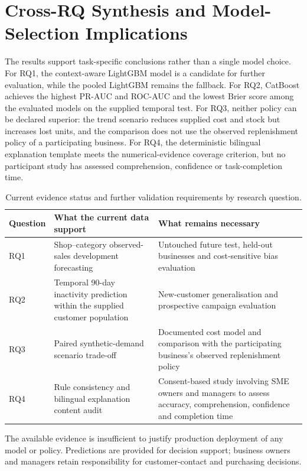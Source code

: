 

\section{Cross-RQ Synthesis and Model-Selection Implications}

The results support task-specific conclusions rather than a single model
choice. For RQ1, the context-aware LightGBM model is a candidate for further
evaluation, while the pooled LightGBM remains the fallback. For RQ2,
CatBoost achieves the highest PR-AUC and ROC-AUC and the lowest Brier score
among the evaluated models on the supplied temporal test. For RQ3, neither
policy can be declared superior: the trend scenario reduces supplied cost
and stock but increases lost units, and the comparison does not use the
observed replenishment policy of a participating business. For RQ4, the
deterministic bilingual explanation template meets the numerical-evidence
coverage criterion, but no participant study has assessed comprehension,
confidence or task-completion time.

\begin{table}[H]
\centering
\small
\caption{Current evidence status and further validation requirements by research question.}
\label{tab:rq_evidence_status}
\begin{tabularx}{\textwidth}{|p{}|X|X|}
\hline
\textbf{Question} & \textbf{What the current data support} & \textbf{What remains necessary} \\
\hline
RQ1 & Shop--category observed-sales development forecasting & Untouched future test, held-out businesses and cost-sensitive bias evaluation \\
\hline
RQ2 & Temporal 90-day inactivity prediction within the supplied customer population & New-customer generalisation and prospective campaign evaluation \\
\hline
RQ3 & Paired synthetic-demand scenario trade-off & Documented cost model and comparison with the participating business's observed replenishment policy \\
\hline
RQ4 & Rule consistency and bilingual explanation content audit & Consent-based study involving SME owners and managers to assess accuracy, comprehension, confidence and completion time \\
\hline
\end{tabularx}
\end{table}

The available evidence is insufficient to justify production deployment of
any model or policy. Predictions are provided for decision support; business
owners and managers retain responsibility for customer-contact and
purchasing decisions.
